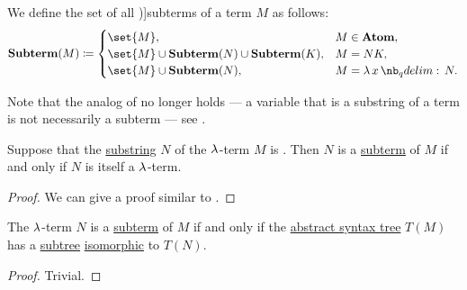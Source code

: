 \begin{definition}\label{def:lambda_subterm}
  We define the set of all \term[ru=подтерм (\cite[189]{Герасимов2011Вычислимость})]{subterms} of a term \( M \) as follows:
  \begin{equation*}
    \op*{Subterm}(M) \coloneqq \begin{cases}
      \set{ M },                                             &M \in \op*{Atom}, \\
      \set{ M } \cup \op*{Subterm}(N) \cup \op*{Subterm}(K), &M = N K, \\
      \set{ M } \cup \op*{Subterm}(N),                       &M = \qabs x N.
    \end{cases}
  \end{equation*}
\end{definition}
\begin{comments}
  \item Note that the analog of  no longer holds --- a variable that is a substring of a term is not necessarily a subterm --- see .
\end{comments}

\begin{proposition}\label{thm:lambda_subterm_characterization}
  Suppose that the \hyperref[def:formal_language/substring]{substring} \( N \) of the \( \mathrm{\lambda} \)-term \( M \) is . Then \( N \) is a \hyperref[def:lambda_subterm]{subterm} of \( M \) if and only if \( N \) is itself a \( \mathrm{\lambda} \)-term.
\end{proposition}
\begin{proof}
  We can give a proof similar to .
\end{proof}

\begin{proposition}\label{thm:lambda_term_ast_subterm}
  The \( \mathrm{\lambda} \)-term \( N \) is a \hyperref[def:lambda_subterm]{subterm} of \( M \) if and only if the \hyperref[def:lambda_term_ast]{abstract syntax tree} \( T(M) \) has a \hyperref[def:tree/subtree]{subtree} \hyperref[def:labeled_tree/homomorphism]{isomorphic} to \( T(N) \).
\end{proposition}
\begin{proof}
  Trivial.
\end{proof}

